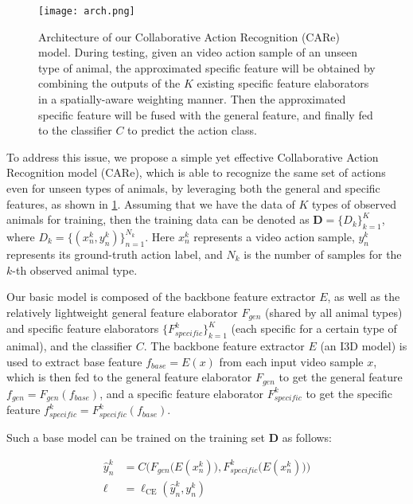 \documentclass[10pt,twocolumn,letterpaper]{article}
\begin{document}
    
    \begin{figure}[t]
      \centering
    
            \texttt{[image: arch.png]}
            \vspace{-0.8cm}
        \caption{Architecture of our Collaborative Action Recognition (CARe) model. During testing, given an video action sample of an unseen type of animal, the approximated specific feature will be obtained by combining the outputs of the $K$ existing specific feature elaborators in a spatially-aware weighting manner. Then the approximated specific feature will be fused with the general feature, and finally fed to the classifier $C$ to predict the action class.
        }
        \label{fig:architecture}
        \vspace{-0.5cm}
    \end{figure}
    
    To address this issue, we propose a simple yet effective Collaborative Action Recognition model (CARe), which is able to recognize the same set of actions even for unseen types of animals, by leveraging both the general and specific features, as shown in \cref{fig:architecture}. Assuming that we have the data of $K$ types of observed animals for training, then the training data can be denoted as $\textbf{D}=\{D_k\}_{k=1}^{K}$, where $D_k=\{(x^k_n,y^k_n)\}_{n=1}^{N_k}$. Here $x^k_n$ represents a video action sample, $y^k_n$ represents its ground-truth action label, and $N_k$ is the number of samples for the $k$-th observed animal type. 
    
    Our basic model is composed of the backbone feature extractor $E$, as well as the relatively lightweight general feature elaborator ${F_{gen}}$ (shared by all animal types) and specific feature elaborators $\{F^k_{specific}\}_{k=1}^{K}$ (each specific for a certain type of animal), and the classifier $C$. The backbone feature extractor $E$ (an I3D model) is used to extract base feature  
    $f_{base}=E(x)$ from each input video sample $x$,
    which is then fed to the general feature elaborator ${F_{gen}}$ to get the general feature $f_{gen}={F_{gen}}(f_{base})$, and a specific feature elaborator $F^k_{specific}$ to get the specific feature $f^k_{specific} = F^k_{specific}(f_{base})$.
    
    Such a base model can be trained on the training set $\textbf{D}$ as follows:
    
    \vspace{-0.6cm}
    \begin{equation}
    \label{eq_loss}
    \begin{aligned}
        \hat{y}_n^k &= C\Big(F_{gen}\big(E(x_n^k)\big), F^k_{specific}\big(E(x_n^k)\big)\Big) \\
        \ell&=\ell_\textrm{CE}(\hat{y}_n^k, y_n^k)
        \end{aligned}
    \end{equation}
    \vspace{-0.4cm}
    
\end{document}
